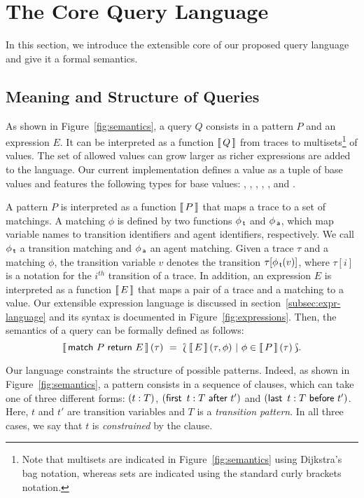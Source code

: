 \documentclass[runningheads]{llncs}
\begin{document}

\section{The Core Query Language}\label{sec:semantics}

In this section, we introduce the extensible core of our proposed
query language and give it a formal semantics.

\subsection{Meaning and Structure of Queries}\label{subsec:structure}
As shown in Figure~\ref{fig:semantics}, a query $Q$ consists in a
pattern $P$ and an expression $E$. It can be interpreted as a function
$\left\llbracket \, Q \, \right\rrbracket$ from traces to multisets\footnote{Note that multisets are
  indicated in Figure~\ref{fig:semantics} using Dijkstra's bag
  notation, whereas sets are indicated using the standard curly
  brackets notation.} of values. The set of allowed values can grow
larger as richer expressions are added to the language. Our current
implementation defines a value as a tuple of base values and features
the following types for base values: , , ,
, ,  and .

A pattern $P$ is interpreted as a function $\left\llbracket \, P \, \right\rrbracket$ that maps a trace
to a set of matchings. A matching $\phi$ is defined by two functions
$\phi_{\,\textsf{t}}$ and $\phi_{\,\textsf{a}}$, which map variable names to transition
identifiers and agent identifiers, respectively. We call $\phi_{\,\textsf{t}}$
a transition matching and $\phi_{\,\textsf{a}}$ an agent matching.  Given a
trace $\tau$ and a matching $\phi$, the transition variable $v$
denotes the transition $\tau[\phi_{\,\textsf{t}}(v)]$, where $\tau[i]$ is a
notation for the $i^{th}$ transition of a trace. In addition, an
expression $E$ is interpreted as a function $\left\llbracket \, E \, \right\rrbracket$ that maps a pair
of a trace and a matching to a value. Our extensible expression
language is discussed in section~\ref{subsec:expr-language} and its
syntax is documented in Figure~\ref{fig:expressions}. Then, the
semantics of a query can be formally defined as follows:
\[ \Sem{\MatchRet{\TracePat}{E}}(\tau) \ = \ \BagC{\Sem{E}(\tau,
    \phi)}{\phi \in \Sem{\TracePat}(\tau) }.  \]

Our language constraints the structure of possible patterns. Indeed,
as shown in Figure~\ref{fig:semantics}, a pattern consists in a
sequence of clauses, which can take one of three different forms:
$(t:T)$, $(\textsf{first} \,\ t:T \ \textsf{after} \ t')$ and
$(\textsf{last} \,\ t:T \ \textsf{before} \ t')$. Here, $t$ and $t'$ are transition
variables and $T$ is a \emph{transition pattern}. In all three cases,
we say that $t$ is \emph{constrained} by the clause.
\end{document}
